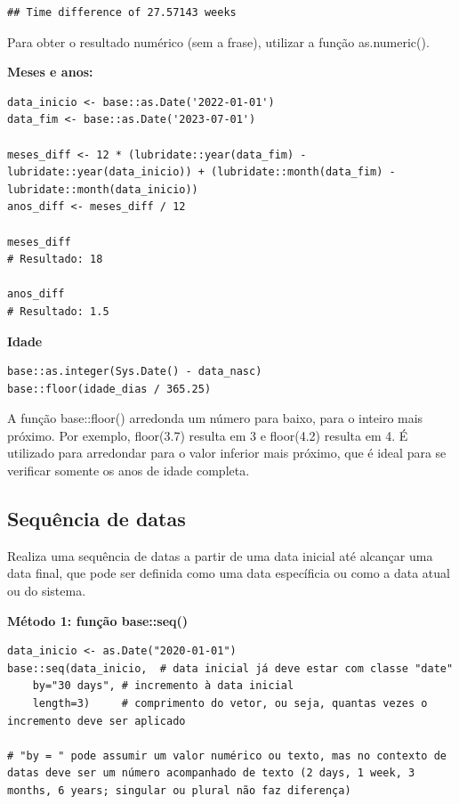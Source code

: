\documentclass[
]{book}
\theoremstyle{definition}
\theoremstyle{definition}
\theoremstyle{definition}
\theoremstyle{definition}
\theoremstyle{remark}
\begin{document}
\begin{verbatim}
## Time difference of 27.57143 weeks
\end{verbatim}

Para obter o resultado numérico (sem a frase), utilizar a função as.numeric().

\textbf{Meses e anos:}

\begin{verbatim}
data_inicio <- base::as.Date('2022-01-01')
data_fim <- base::as.Date('2023-07-01')

meses_diff <- 12 * (lubridate::year(data_fim) - lubridate::year(data_inicio)) + (lubridate::month(data_fim) - lubridate::month(data_inicio))
anos_diff <- meses_diff / 12

meses_diff
# Resultado: 18

anos_diff
# Resultado: 1.5
\end{verbatim}

\textbf{Idade}

\begin{verbatim}
base::as.integer(Sys.Date() - data_nasc)
base::floor(idade_dias / 365.25)
\end{verbatim}

A função base::floor() arredonda um número para baixo, para o inteiro mais próximo. Por exemplo, floor(3.7) resulta em 3 e floor(4.2) resulta em 4. É utilizado para arredondar para o valor inferior mais próximo, que é ideal para se verificar somente os anos de idade completa.

\hypertarget{sequuxeancia-de-datas}{%
\subsection{Sequência de datas}\label{sequuxeancia-de-datas}}

Realiza uma sequência de datas a partir de uma data inicial até alcançar uma data final, que pode ser definida como uma data específicia ou como a data atual ou do sistema.

\textbf{Método 1: função base::seq()}

\begin{verbatim}
data_inicio <- as.Date("2020-01-01")
base::seq(data_inicio,  # data inicial já deve estar com classe "date"
    by="30 days", # incremento à data inicial
    length=3)     # comprimento do vetor, ou seja, quantas vezes o incremento deve ser aplicado
    
# "by = " pode assumir um valor numérico ou texto, mas no contexto de datas deve ser um número acompanhado de texto (2 days, 1 week, 3 months, 6 years; singular ou plural não faz diferença) 
\end{verbatim}
\end{document}
